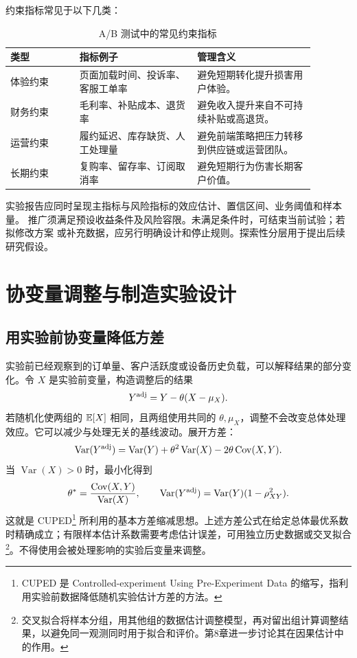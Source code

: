约束指标常见于以下几类：
\begin{table}[htbp]
\centering
\caption{A/B 测试中的常见约束指标}
\begin{tabular}{P{0.20\linewidth}P{0.34\linewidth}P{0.34\linewidth}}
\toprule
{}
类型 & 指标例子 & 管理含义\\
\midrule

体验约束 & 页面加载时间、投诉率、客服工单率 & 避免短期转化提升损害用户体验。\\
财务约束 & 毛利率、补贴成本、退货率 & 避免收入提升来自不可持续补贴或高退货。\\
运营约束 & 履约延迟、库存缺货、人工处理量 & 避免前端策略把压力转移到供应链或运营团队。\\
长期约束 & 复购率、留存率、订阅取消率 & 避免短期行为伤害长期客户价值。\\
\bottomrule
\end{tabular}
\end{table}

实验报告应同时呈现主指标与风险指标的效应估计、置信区间、业务阈值和样本量。
推广须满足预设收益条件及风险容限。未满足条件时，可结束当前试验；若拟修改方案
或补充数据，应另行明确设计和停止规则。探索性分层用于提出后续研究假设。

\section{协变量调整与制造实验设计}

\subsection{用实验前协变量降低方差}
实验前已经观察到的订单量、客户活跃度或设备历史负载，可以解释结果的部分变化。令 \(X\) 是实验前变量，构造调整后的结果
\[
Y^{\rm adj}=Y-\theta(X-\mu_X).
\]
若随机化使两组的 \(\mathbb E[X]\) 相同，且两组使用共同的 \(\theta,\mu_X\)，调整不会改变总体处理效应。它可以减少与处理无关的基线波动。展开方差：
\[
\operatorname{Var}(Y^{\rm adj})
=\operatorname{Var}(Y)+\theta^2\operatorname{Var}(X)
-2\theta\operatorname{Cov}(X,Y).
\]
当 \(\operatorname{Var}(X)>0\) 时，最小化得到
\[
\theta^*=\frac{\operatorname{Cov}(X,Y)}{\operatorname{Var}(X)},
\qquad
\operatorname{Var}(Y^{\rm adj})=\operatorname{Var}(Y)(1-\rho_{XY}^2).
\]
这就是 CUPED\footnote{CUPED 是 Controlled-experiment Using Pre-Experiment Data 的缩写，指利用实验前数据降低随机实验估计方差的方法。} 所利用的基本方差缩减思想\cite{cuped06}。上述方差公式在给定总体最优系数时精确成立；有限样本估计系数需要考虑估计误差，可用独立历史数据或交叉拟合\footnote{交叉拟合将样本分组，用其他组的数据估计调整模型，再对留出组计算调整结果，以避免同一观测同时用于拟合和评价。第8章进一步讨论其在因果估计中的作用。}。不得使用会被处理影响的实验后变量来调整。

